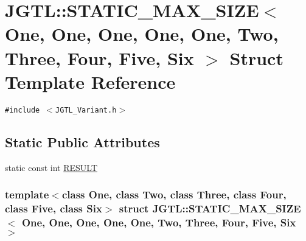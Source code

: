 \hypertarget{struct_j_g_t_l_1_1_s_t_a_t_i_c___m_a_x___s_i_z_e_3_01_one_00_01_one_00_01_one_00_01_one_00_01_on9f6e865142ccd9af848bb97d1dbfdb72}{
\section{JGTL::STATIC\_\-MAX\_\-SIZE$<$ One, One, One, One, One, Two, Three, Four, Five, Six $>$ Struct Template Reference}
\label{struct_j_g_t_l_1_1_s_t_a_t_i_c___m_a_x___s_i_z_e_3_01_one_00_01_one_00_01_one_00_01_one_00_01_on9f6e865142ccd9af848bb97d1dbfdb72}
}
{\tt \#include $<$JGTL\_\-Variant.h$>$}

\subsection*{Static Public Attributes}
\begin{CompactItemize}
\item 
static const int \hyperlink{struct_j_g_t_l_1_1_s_t_a_t_i_c___m_a_x___s_i_z_e_3_01_one_00_01_one_00_01_one_00_01_one_00_01_on9f6e865142ccd9af848bb97d1dbfdb72_a38f542b3bab6ed4663e92dc94693ca7}{RESULT}
\end{CompactItemize}
\subsubsection*{template$<$class One, class Two, class Three, class Four, class Five, class Six$>$ struct JGTL::STATIC\_\-MAX\_\-SIZE$<$ One, One, One, One, One, Two, Three, Four, Five, Six $>$}



